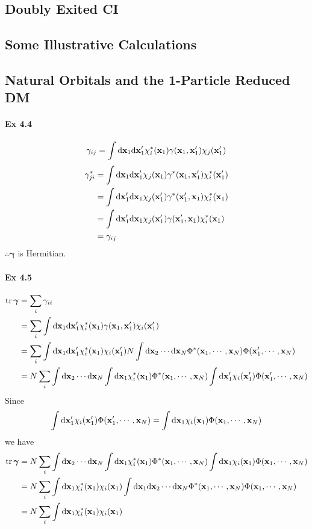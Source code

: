 \documentclass[a4paper]{article}
\newcommand{\ex}[1]{\paragraph{Ex #1}}
\numberwithin{equation}{subsection}
\begin{document}
\subsection{Doubly Exited CI}

\subsection{Some Illustrative Calculations}

\subsection{Natural Orbitals and the 1-Particle Reduced DM}
\ex{4.4}
\begin{equation}\label{key}
\gamma_{ij} = \int\dd\vb{x}_1\dd\vb{x}'_1 \chi_i^*(\vb{x}_1) \gamma(\vb{x}_1,\vb{x}'_1) \chi_j(\vb{x}'_1)
\end{equation}
\begin{align}
\gamma_{ji}^* &= \int\dd\vb{x}_1\dd\vb{x}'_1 \chi_j(\vb{x}_1) \gamma^*(\vb{x}_1,\vb{x}'_1) \chi_i^*(\vb{x}'_1) \notag\\
&= \int\dd\vb{x}'_1\dd\vb{x}_1 \chi_j(\vb{x}'_1) \gamma^*(\vb{x}'_1,\vb{x}_1) \chi_i^*(\vb{x}_1) \notag\\
&= \int\dd\vb{x}'_1\dd\vb{x}_1 \chi_j(\vb{x}'_1) \gamma(\vb{x}'_1,\vb{x}_1) \chi_i^*(\vb{x}_1) \notag\\
&= \gamma_{ij}
\end{align}
$ \therefore \bm\gamma$ is Hermitian.

\ex{4.5}
\begin{align}
\tr \bm\gamma &= \sum_i \gamma_{ii} \notag\\
&= \sum_i \int\dd\vb{x}_1\dd\vb{x}'_1 \chi_i^*(\vb{x}_1) \gamma(\vb{x}_1,\vb{x}'_1) \chi_i(\vb{x}'_1) \notag\\
&= \sum_i \int\dd\vb{x}_1\dd\vb{x}'_1 \chi_i^*(\vb{x}_1)  \chi_i(\vb{x}'_1)N\int \dd\vb{x}_2\cdots\dd\vb{x}_N \Phi^*(\vb{x}_1,\cdots,\vb{x}_N)\Phi(\vb{x}'_1,\cdots,\vb{x}_N) \notag\\
&= N\sum_i \int \dd\vb{x}_2\cdots\dd\vb{x}_N \int\dd\vb{x}_1\chi_i^*(\vb{x}_1)\Phi^*(\vb{x}_1,\cdots,\vb{x}_N) \int\dd\vb{x}'_1  \chi_i(\vb{x}'_1) \Phi(\vb{x}'_1,\cdots,\vb{x}_N) 
\end{align}
Since
\begin{equation}\label{key}
\int\dd\vb{x}'_1  \chi_i(\vb{x}'_1) \Phi(\vb{x}'_1,\cdots,\vb{x}_N) = \int\dd\vb{x}_1\chi_i(\vb{x}_1)\Phi(\vb{x}_1,\cdots,\vb{x}_N) 
\end{equation}
we have
\begin{align}
\tr \bm\gamma &= N\sum_i \int \dd\vb{x}_2\cdots\dd\vb{x}_N \int\dd\vb{x}_1\chi_i^*(\vb{x}_1)\Phi^*(\vb{x}_1,\cdots,\vb{x}_N) \int\dd\vb{x}_1  \chi_i(\vb{x}_1) \Phi(\vb{x}_1,\cdots,\vb{x}_N) \notag\\
&= N\sum_i \int\dd\vb{x}_1\chi_i^*(\vb{x}_1)  \chi_i(\vb{x}_1) 
\int \dd\vb{x}_1\dd\vb{x}_2\cdots\dd\vb{x}_N \Phi^*(\vb{x}_1,\cdots,\vb{x}_N) \Phi(\vb{x}_1,\cdots,\vb{x}_N) \notag\\
&= N\sum_i \int\dd\vb{x}_1\chi_i^*(\vb{x}_1)  \chi_i(\vb{x}_1) 
\end{align}
\end{document}
